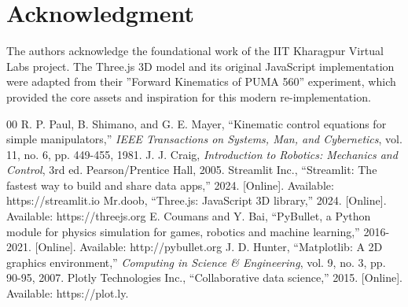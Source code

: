\documentclass[conference]{IEEEtran}
\begin{document}
\section*{Acknowledgment}
The authors acknowledge the foundational work of the IIT Kharagpur Virtual Labs project. The Three.js 3D model and its original JavaScript implementation were adapted from their ”Forward Kinematics of PUMA 560” experiment, which provided the core assets and inspiration for this modern re-implementation.

\begin{thebibliography}{00}
 R. P. Paul, B. Shimano, and G. E. Mayer, ``Kinematic control equations for simple manipulators,'' \emph{IEEE Transactions on Systems, Man, and Cybernetics}, vol. 11, no. 6, pp. 449-455, 1981.
 J. J. Craig, \emph{Introduction to Robotics: Mechanics and Control}, 3rd ed. Pearson/Prentice Hall, 2005.
 Streamlit Inc., ``Streamlit: The fastest way to build and share data apps,'' 2024. [Online]. Available: https://streamlit.io
 Mr.doob, ``Three.js: JavaScript 3D library,'' 2024. [Online]. Available: https://threejs.org
 E. Coumans and Y. Bai, ``PyBullet, a Python module for physics simulation for games, robotics and machine learning,'' 2016-2021. [Online]. Available: http://pybullet.org
 J. D. Hunter, ``Matplotlib: A 2D graphics environment,'' \emph{Computing in Science \& Engineering}, vol. 9, no. 3, pp. 90-95, 2007.
 Plotly Technologies Inc., ``Collaborative data science,'' 2015. [Online]. Available: https://plot.ly.
\end{thebibliography}
\end{document}
